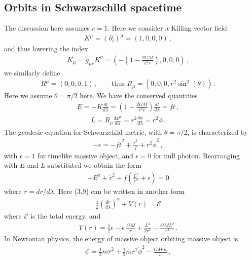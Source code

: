 \documentclass[11pt, onesided]{book}
\theoremstyle{break}
\theoremstyle{break}
\newcommand{\pd}{\partial}
\begin{document}
\subsection{Orbits in Schwarzschild spacetime}
The discussion here assumes $c = 1$. Here we consider a Killing vector field
\begin{align*}
K^\mu = (\pd_t)^\mu = (1,0,0,0) \,,
\end{align*}
and thus lowering the index
\begin{align*}
K_\mu = g_{\mu\nu}K^\nu = \left( -\left(1 - \frac{2GM}{c^2 r}\right), 0,0,0\right)\,,
\end{align*}
we similarly define
\begin{align*}
R^\mu = (0,0,0,1) \,,\qquad \text{thus }R_\mu = (0,0,0,r^2 \sin^2(\theta))\,.
\end{align*}
Here we assume $\theta = \pi/2$ here. We have the conserved quantities
\begin{align*}
E = -K \frac{dt}{d\lambda} = \left( 1 - \frac{2GM}{c^2 r}\right) \frac{dt}{d\lambda} = f\dot{t}\,,
\end{align*}
\begin{align*}
L = R_{\mu}\frac{dx^\mu}{d\lambda} = r^2 \frac{d\phi}{d\lambda} = r^2 \dot{\phi}\,.
\end{align*}
The geodesic equation for Schwarzchild metric, with $\theta = \pi/2$, is characterized by
\begin{align*}
-\epsilon = -f\dot{t}^2 + \frac{\dot{r}^2}{f} + r^2 \dot{\phi}^2\,,
\end{align*}
with $\epsilon=1$ for timelike massive object, and $\epsilon = 0$ for null photon. Rearranging with $E$ and $L$ substituted we obtain the form
\begin{align}
-E^2 + \dot{r}^2 + f\left( \frac{L^2}{r^2}+\epsilon\right) = 0
\end{align}
where $\dot{r} = dr/d\lambda$. Here (3.9) can be written in another form
\begin{align*}
\frac{1}{2}\left( \frac{dr}{d\lambda}\right)^2 + V(r) = \mathcal{E}
\end{align*}
where $\mathcal{E}$ is the total energy, and
\begin{align}
V(r) = \frac{1}{2}\epsilon - \epsilon\,\frac{GM}{r} + \frac{L^2}{2r^2} - \frac{GML^2}{r^3}\,.
\end{align}
In Newtonian physics, the energy of massive object orbiting massive object is 
\begin{align*}
\mathcal{E} = \frac{1}{2}m\dot{r}^2 + \frac{1}{2}mr^2 \dot{\phi}^2 - \frac{GMm}{r}\,,
\end{align*}
\end{document}
